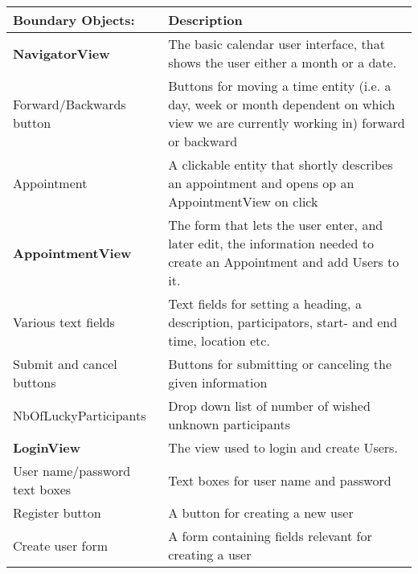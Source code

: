 {\tabulinesep=1.2mm
\begin{tabu}{ | p{6cm} | p{10cm} |}
    \hline
\textbf{Boundary Objects:}	& 		\textbf{Description}\\ \hline
    \textbf{NavigatorView}	      	&       The basic calendar user interface, that shows the user either a month or a date.\\\hline
    Forward/Backwards button			&       Buttons for moving a time entity (i.e. a day, week or month dependent on which view we are currently working in) forward or backward\\\hline
    Appointment  						&       A clickable entity that shortly describes an appointment and opens op an AppointmentView on click\\\hline
    \textbf{AppointmentView}  		&       The form that lets the user enter, and later edit, the information needed to create an Appointment and add Users to it.\\\hline
    Various text fields					&		Text fields for setting a heading, a description, participators, start- and end time, location etc.\\\hline
    Submit and cancel buttons			&		Buttons for submitting or canceling the given information\\\hline
    NbOfLuckyParticipants				&		Drop down list of number of wished unknown participants\\\hline
    \textbf{LoginView}  				&       The view used to login and create Users.\\\hline
    User name/password text boxes		&		Text boxes for user name and password\\\hline
    Register button 					& 		A button for creating a new user\\\hline
    Create user form 					&		A form containing fields relevant for creating a user\\\hline
\end{tabu}
}